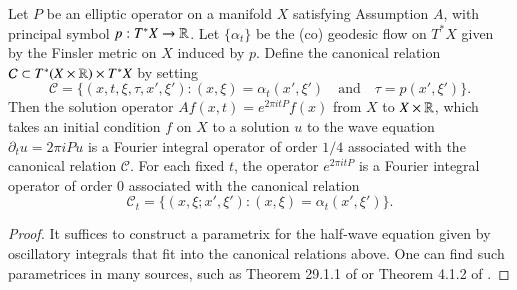 \begin{theorem} \label{waveisanFIOTheorem}
  Let $P$ be an elliptic operator on a manifold $X$ satisfying Assumption $A$, with principal symbol $p: T^* X \to \operatorname{\mathbb{R}}$. Let $\{ \alpha_t \}$ be the (co) geodesic flow on $T^* X$ given by the Finsler metric on $X$ induced by $p$.  Define the canonical relation $\mathcal{C} \subset T^* (X \times \operatorname{\mathbb{R}}) \times T^* X$ by setting
  \[ \mathcal{C} = \{ (x,t,\xi,\tau,x',\xi') : (x,\xi) = \alpha_t(x',\xi') \quad\text{and}\quad \tau = p(x',\xi') \}. \]
  Then the solution operator $Af(x,t) = e^{2 \pi i t P}f(x)$ from $X$ to $X \times \operatorname{\mathbb{R}}$, which takes an initial condition $f$ on $X$ to a solution $u$ to the wave equation $\partial_t u = 2 \pi i P u$ is a Fourier integral operator of order $1/4$ associated with the canonical relation $\mathcal{C}$. For each fixed $t$, the operator $e^{2 \pi i t P}$ is a Fourier integral operator of order $0$ associated with the canonical relation
  \[ \mathcal{C}_t = \{ (x,\xi;x',\xi') : (x,\xi) = \alpha_t(x',\xi') \}. \]
\end{theorem}
\begin{proof}
  It suffices to construct a parametrix for the half-wave equation given by oscillatory integrals that fit into the canonical relations above. One can find such parametrices in many sources, such as Theorem 29.1.1 of \cite{Hormander4} or Theorem 4.1.2 of \cite{Sogge}.
\end{proof}

